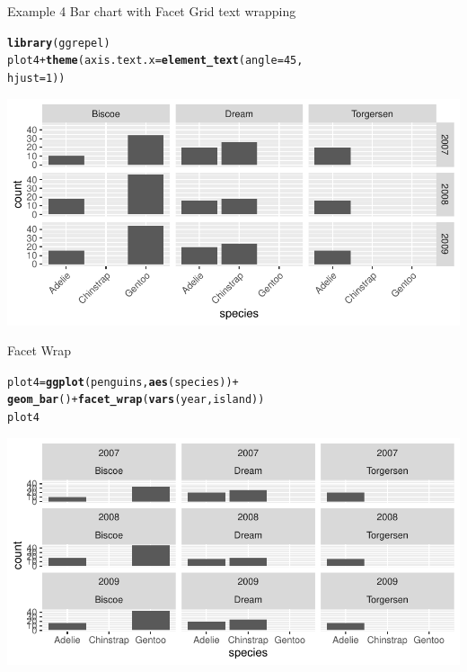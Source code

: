 \documentclass{beamer}\usepackage[]{graphicx}\usepackage[]{color}
\makeatletter
\newcommand{\hlnum}[1]{\textcolor[rgb]{0.686,0.059,0.569}{#1}}%
\newcommand{\hlopt}[1]{\textcolor[rgb]{0,0,0}{#1}}%
\newcommand{\hlstd}[1]{\textcolor[rgb]{0.345,0.345,0.345}{#1}}%
\newcommand{\hlkwb}[1]{\textcolor[rgb]{0.69,0.353,0.396}{#1}}%
\newcommand{\hlkwc}[1]{\textcolor[rgb]{0.333,0.667,0.333}{#1}}%
\newcommand{\hlkwd}[1]{\textcolor[rgb]{0.737,0.353,0.396}{\textbf{#1}}}%
\newenvironment{kframe}{%
 \def\at@end@of@kframe{}%
 \ifinner\ifhmode%
  \def\at@end@of@kframe{\end{minipage}}%
  \begin{minipage}{\columnwidth}%
 \fi\fi%
 \def\FrameCommand##1{\hskip\@totalleftmargin \hskip-\fboxsep
 \colorbox{shadecolor}{##1}\hskip-\fboxsep
     \hskip-\linewidth \hskip-\@totalleftmargin \hskip\columnwidth}%
 \MakeFramed {\advance\hsize-\width
   \@totalleftmargin\z@ \linewidth\hsize
   \@setminipage}}%
 {\par\unskip\endMakeFramed%
 \at@end@of@kframe}
\newenvironment{knitrout}{}{} %
\makeatother
\begin{document}
\begin{frame}[fragile]{Example 4 Bar chart with Facet Grid text wrapping }
\begin{knitrout}
\color{fgcolor}\begin{kframe}
\begin{alltt}
\hlkwd{library}\hlstd{(ggrepel)}
\hlstd{plot4} \hlopt{+} \hlkwd{theme}\hlstd{(}\hlkwc{axis.text.x} \hlstd{=} \hlkwd{element_text}\hlstd{(}\hlkwc{angle} \hlstd{=} \hlnum{45}\hlstd{,}
    \hlkwc{hjust} \hlstd{=} \hlnum{1}\hlstd{))}
\end{alltt}
\end{kframe}
\includegraphics[width=0.95\linewidth]{figure/unnamed-chunk-17-1} 
\end{knitrout}
\end{frame}

\begin{frame}[fragile]{Facet Wrap}
\begin{knitrout}
\color{fgcolor}\begin{kframe}
\begin{alltt}
\hlstd{plot4} \hlkwb{=} \hlkwd{ggplot}\hlstd{(penguins,} \hlkwd{aes}\hlstd{(species))} \hlopt{+}
    \hlkwd{geom_bar}\hlstd{()} \hlopt{+} \hlkwd{facet_wrap}\hlstd{(}\hlkwd{vars}\hlstd{(year, island))}
\hlstd{plot4}
\end{alltt}
\end{kframe}
\includegraphics[width=0.95\linewidth]{figure/unnamed-chunk-18-1} 
\end{knitrout}

\end{frame}
\end{document}
